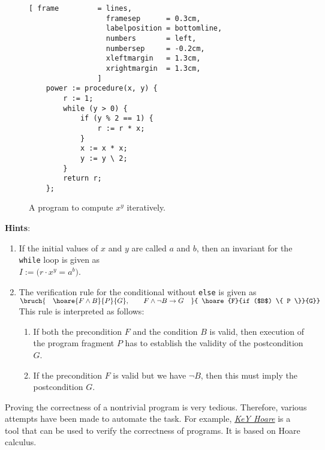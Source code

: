 \begin{figure}[!h]
\centering
\begin{Verbatim}[ frame         = lines, 
                  framesep      = 0.3cm, 
                  labelposition = bottomline,
                  numbers       = left,
                  numbersep     = -0.2cm,
                  xleftmargin   = 1.3cm,
                  xrightmargin  = 1.3cm,
                ]
    power := procedure(x, y) {
        r := 1;
        while (y > 0) {
            if (y % 2 == 1) {
                r := r * x;
            }
            x := x * x;
            y := y \ 2;
        }
        return r;
    };
\end{Verbatim}
\vspace*{-0.3cm}
\caption{A program to compute $x^y$ iteratively.}
\label{fig:power-iterative.stlx}
\end{figure}


\noindent
\textbf{Hints}: 
\begin{enumerate}
\item If the initial values of $x$ and $y$ are called $a$ and $b$,
      then an invariant for the \texttt{while} loop is given as 
      \\[0.2cm]
      \hspace*{1.3cm}
      $I := \bigl(r \cdot x^y = a^b\bigr)$.
\item The verification rule for the conditional without \texttt{else} is given as
      \\[0.4cm]
      \hspace*{1.3cm}
      $\bruch{\quad\hoare{F \wedge B}{P}{G}, \qquad F \wedge \neg B \rightarrow G\quad}{
                     \hoare{F}{if ($B$) \{ P \}}{G}}
      $
      \\[0.2cm]
      This rule is interpreted as follows:
      \begin{enumerate}
      \item If both the precondition $F$ and the condition $B$ is valid, then execution of the
            program fragment $P$ has to establish the validity of the postcondition $G$.
      \item If the precondition $F$ is valid but we have $\neg B$, then this must imply the postcondition
            $G$.
      \end{enumerate}
\end{enumerate}

\remark
Proving the correctness of a nontrivial program is very tedious.
Therefore, various attempts have been made to automate the task.  For
example, \href{http://www.key-project.org/download/hoare/}{\emph{KeY Hoare}}
is a tool that can be used to verify the correctness of programs.  It is based on
Hoare calculus.


